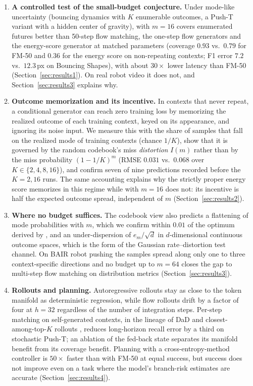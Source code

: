 \begin{enumerate}
\item \textbf{A controlled test of the small-budget conjecture.} Under mode-like uncertainty (bouncing dynamics with $K$ enumerable outcomes, a Push-T variant with a hidden center of gravity), \nom{} with $m{=}16$ covers enumerated futures better than 50-step flow matching, the one-step flow generators and the energy-score generator at matched parameters (coverage $0.93$ vs.\ $0.79$ for FM-50 and $0.36$ for the energy score on non-repeating contexts; F1 error $7.2$ vs.\ $12.3$\,px on Bouncing Shapes), with about $30\times$ lower latency than FM-50 (Section~\ref{sec:results1}). On real robot video it does not, and Section~\ref{sec:results3} explains why.
\item \textbf{Outcome memorization and its incentive.} In contexts that never repeat, a conditional generator can reach zero training loss by memorizing the realized outcome of each training context, keyed on its appearance, and ignoring its noise input. We measure this with the share of samples that fall on the realized mode of training contexts (chance $1/K$), show that it is governed by the random codebook's miss \emph{distortion} $I(m)$ rather than by the miss probability $(1-1/K)^m$ (RMSE $0.031$ vs.\ $0.068$ over $K\in\{2,4,8,16\}$), and confirm seven of nine predictions recorded before the $K{=}2,16$ runs. The same accounting explains why the strictly proper energy score memorizes in this regime while \nom{} with $m{=}16$ does not: its incentive is half the expected outcome spread, independent of $m$ (Section~\ref{sec:results2}).
\item \textbf{Where no budget suffices.} The codebook view also predicts a flattening of mode probabilities with $m$, which we confirm within $0.01$ of the optimum derived by \citet{bennett2026freedom}, and an under-dispersion of $e_m/\sqrt{d}$ in $d$-dimensional continuous outcome spaces, which is the form of the Gaussian rate--distortion test channel. On BAIR robot pushing the samples spread along only one to three context-specific directions and no budget up to $m{=}64$ closes the gap to multi-step flow matching on distribution metrics (Section~\ref{sec:results3}).
\item \textbf{Rollouts and planning.} Autoregressive \nom{} rollouts stay as close to the token manifold as deterministic regression, while flow rollouts drift by a factor of four at $h{=}32$ regardless of the number of integration steps. Per-step matching on self-generated contexts, in the lineage of DaD and closest-among-top-$K$ rollouts \citep{venkatraman2015dad,zhang2025catk}, reduces long-horizon recall error by a third on stochastic Push-T; an ablation of the fed-back state separates its manifold benefit from its coverage benefit. Planning with a cross-entropy-method controller is $50\times$ faster than with FM-50 at equal success, but success does not improve even on a task where the model's branch-risk estimates are accurate (Section~\ref{sec:results4}).
\end{enumerate}


